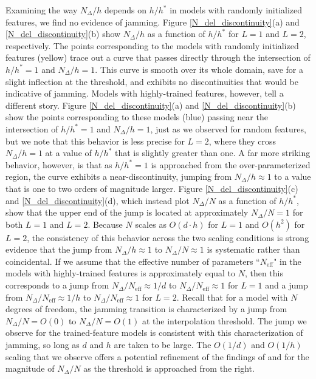 \documentclass[11pt]{article}
\begin{document}
Examining the way $N_\Delta/h$ depends on $h/h^*$ in models with randomly initialized features, we find no evidence of jamming. Figure \ref{N_del_discontinuity}(a) and \ref{N_del_discontinuity}(b) show $N_\Delta/h$ as a function of $h/h^*$ for $L=1$ and $L=2$, respectively. The points corresponding to the models with randomly initialized features (yellow) trace out a curve that passes directly through the intersection of $h/h^*=1$ and $N_\Delta/h=1$. This curve is smooth over its whole domain, save for a slight inflection at the threshold, and exhibits no discontinuities that would be indicative of jamming. Models with highly-trained features, however, tell a different story. Figure \ref{N_del_discontinuity}(a) and \ref{N_del_discontinuity}(b) show the points corresponding to these models (blue) passing near the intersection of $h/h^*=1$ and $N_\Delta/h=1$, just as we observed for random features, but we note that this behavior is less precise for $L=2$, where they cross $N_\Delta/h=1$ at a value of $h/h^*$ that is slightly greater than one. A far more striking behavior, however, is that as $h/h^*=1$ is approached from the over-parameterized region, the curve exhibits a near-discontinuity, jumping from $N_\Delta/h\approx1$ to a value that is one to two orders of magnitude larger. Figure \ref{N_del_discontinuity}(c) and \ref{N_del_discontinuity}(d), which instead plot $N_\Delta/N$ as a function of $h/h^*$, show that the upper end of the jump is located at approximately $N_\Delta/N = 1$ for both $L=1$ and $L=2$. Because $N$ scales as $O(d\cdot h)$ for $L=1$ and $O(h^2)$ for $L=2$, the consistency of this behavior across the two scaling conditions is strong evidence that the jump from $N_\Delta/h \approx 1$ to $N_\Delta/N \approx 1$ is systematic rather than coincidental. If we assume that the effective number of parameters ``$N_\text{eff}$" in the models with highly-trained features is approximately equal to $N$, then this corresponds to a jump from $N_\Delta / N_\text{eff} \approx 1/d$ to $N_\Delta / N_\text{eff} \approx 1$ for $L=1$ and a jump from $N_\Delta / N_\text{eff} \approx 1/h$ to $N_\Delta / N_\text{eff} \approx 1$ for $L=2$. Recall that for a model with $N$ degrees of freedom, the jamming transition is characterized by a jump from $N_\Delta/N = O(0)$ to $N_\Delta/N = O(1)$ at the interpolation threshold. The jump we observe for the trained-feature models is consistent with this characterization of jamming, so long as $d$ and $h$ are taken to be large. The $O(1/d)$ and $O(1/h)$ scaling that we observe offers a potential refinement of the findings of \cite{geigerJammingTransitionParadigm2019} and \cite{spiglerJammingTransitionOverparametrization2019} for the magnitude of $N_\Delta/N$ as the threshold is approached from the right. \\
\end{document}

